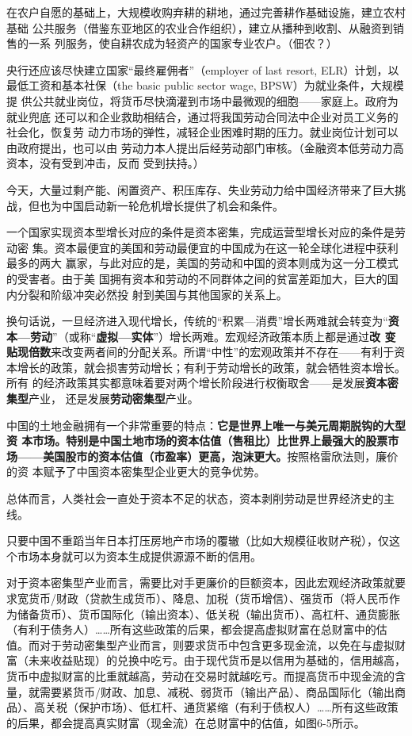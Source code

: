 在农户自愿的基础上，大规模收购弃耕的耕地，通过完善耕作基础设施，建立农村基础
公共服务（借鉴东亚地区的农业合作组织），建立从播种到收割、从融资到销售的一系
列服务，使自耕农成为轻资产的国家专业农户。（佃农？）


央行还应该尽快建立国家“最终雇佣者”（employer of last resort, ELR）计划，以
最低工资和基本社保（the basic public sector wage, BPSW）为就业条件，大规模提
供公共就业岗位，将货币尽快滴灌到市场中最微观的细胞——家庭上。政府为就业兜底
还可以和企业救助相结合，通过将我国劳动合同法中企业对员工义务的社会化，恢复劳
动力市场的弹性，减轻企业困难时期的压力。就业岗位计划可以由政府提出，也可以由
劳动力本人提出后经劳动部门审核。（金融资本低劳动力高资本，没有受到冲击，反而
受到扶持。）

今天，大量过剩产能、闲置资产、积压库存、失业劳动力给中国经济带来了巨大挑战，但也为中国启动新一轮危机增长提供了机会和条件。

一个国家实现资本型增长对应的条件是资本密集，完成运营型增长对应的条件是劳动密
集。资本最便宜的美国和劳动最便宜的中国成为在这一轮全球化进程中获利最多的两大
赢家，与此对应的是，美国的劳动和中国的资本则成为这一分工模式的受害者。由于美
国拥有资本和劳动的不同群体之间的贫富差距加大，巨大的国内分裂和阶级冲突必然投
射到美国与其他国家的关系上。

换句话说，一旦经济进入现代增长，传统的“积累—消费”增长两难就会转变为“\textbf{资
  本—劳动}”（或称“\textbf{虚拟—实体}”）增长两难。宏观经济政策本质上都是通过\textbf{改
变贴现倍数}来改变两者间的分配关系。所谓“中性”的宏观政策并不存在——有利于资
本增长的政策，就会损害劳动增长；有利于劳动增长的政策，就会牺牲资本增长。所有
的经济政策其实都意味着要对两个增长阶段进行权衡取舍——是发展\textbf{资本密集型}产业，
还是发展\textbf{劳动密集型}产业。

中国的土地金融拥有一个非常重要的特点：\textbf{它是世界上唯一与美元周期脱钩的大型资
  本市场。特别是中国土地市场的资本估值（售租比）比世界上最强大的股票市
  场——美国股市的资本估值（市盈率）更高，泡沫更大。}按照格雷欣法则，廉价的资
本赋予了中国资本密集型企业更大的竞争优势。

总体而言，人类社会一直处于资本不足的状态，资本剥削劳动是世界经济史的主线。

只要中国不重蹈当年日本打压房地产市场的覆辙（比如大规模征收财产税），仅这个市场本身就可以为资本生成提供源源不断的信用。

对于资本密集型产业而言，需要比对手更廉价的巨额资本，因此宏观经济政策就要求宽货币/财政（贷款生成货币）、降息、加税（货币增信）、强货币（将人民币作为储备货币）、货币国际化（输出资本）、低关税（输出货币）、高杠杆、通货膨胀（有利于债务人）……所有这些政策的后果，都会提高虚拟财富在总财富中的估值。而对于劳动密集型产业而言，则要求货币中包含更多现金流，以免在与虚拟财富（未来收益贴现）的兑换中吃亏。由于现代货币是以信用为基础的，信用越高，货币中虚拟财富的比重就越高，劳动在交易时就越吃亏。而提高货币中现金流的含量，就需要紧货币/财政、加息、减税、弱货币（输出产品）、商品国际化（输出商品）、高关税（保护市场）、低杠杆、通货紧缩（有利于债权人）……所有这些政策的后果，都会提高真实财富（现金流）在总财富中的估值，如图6-5所示。

